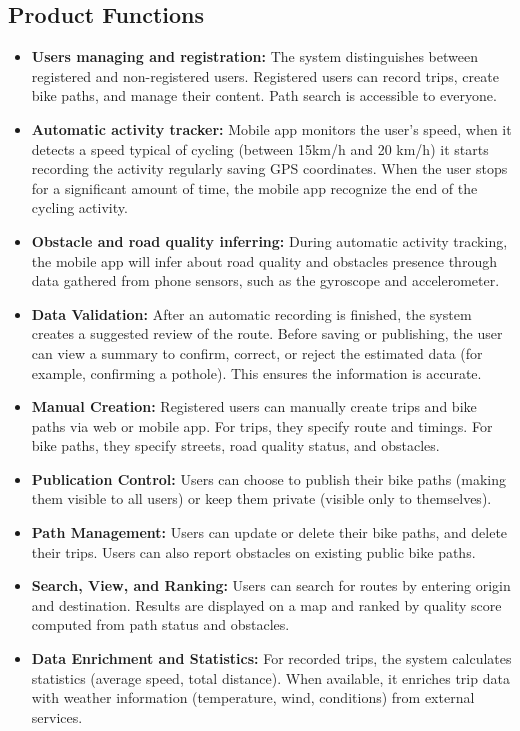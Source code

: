 \subsection{Product Functions}
\begin{itemize}
    \item \textbf{Users managing and registration:}
    The system distinguishes between registered and non-registered users. Registered users can record trips, create bike paths, and manage their content. Path search is accessible to everyone.
    
    \item \textbf{Automatic activity tracker:}
    Mobile app monitors the user's speed, when it detects a speed typical of cycling (between 15km/h and 20 km/h) it starts recording the activity regularly saving GPS coordinates. When the user stops for a significant amount of time, the mobile app recognize the end of the cycling activity.
    \item \textbf{Obstacle and road quality inferring:}
    During automatic activity tracking, the mobile app will infer about road quality and obstacles presence through data gathered from phone sensors, such as the gyroscope and accelerometer.

    \item \textbf{Data Validation:}
    After an automatic recording is finished, the system creates a suggested review of the route. Before saving or publishing, the user can view a summary to confirm, correct, or reject the estimated data (for example, confirming a pothole). This ensures the information is accurate.

    \item \textbf{Manual Creation:}
    Registered users can manually create trips and bike paths via web or mobile app. For trips, they specify route and timings. For bike paths, they specify streets, road quality status, and obstacles.

    \item \textbf{Publication Control:}
    Users can choose to publish their bike paths (making them visible to all users) or keep them private (visible only to themselves).

    \item \textbf{Path Management:}
    Users can update or delete their bike paths, and delete their trips. Users can also report obstacles on existing public bike paths.

    \item \textbf{Search, View, and Ranking:}
    Users can search for routes by entering origin and destination. Results are displayed on a map and ranked by quality score computed from path status and obstacles.

    \item \textbf{Data Enrichment and Statistics:}
    For recorded trips, the system calculates statistics (average speed, total distance). When available, it enriches trip data with weather information (temperature, wind, conditions) from external services.
\end{itemize}

